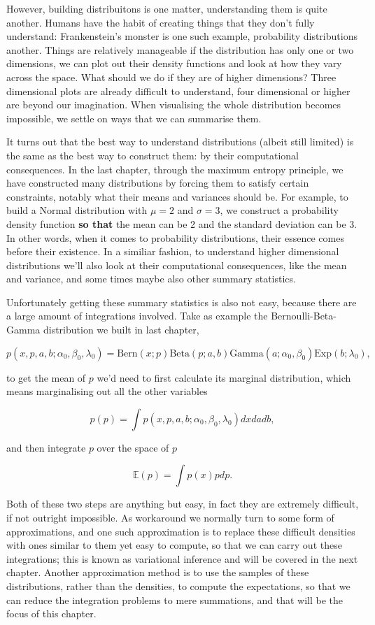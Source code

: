 \documentclass[11pt]{article}
\begin{document}
However, building distribuitons is one matter, understanding them is quite another. Humans have the habit of creating things that they don't fully understand: Frankenstein's monster is one such example, probability distributions another. Things are relatively manageable if the distribution has only one or two dimensions, we can plot out their density functions and look at how they vary across the space. What should we do if they are of higher dimensions? Three dimensional plots are already difficult to understand, four dimensional or higher are beyond our imagination. When visualising the whole distribution becomes impossible, we settle on ways that we can summarise them.

It turns out that the best way to understand distributions (albeit still limited) is the same as the best way to construct them: by their computational consequences. In the last chapter, through the maximum entropy principle, we have constructed many distributions by forcing them to satisfy certain constraints, notably what their means and variances should be. For example, to build a Normal distribution with \(\mu=2\) and \(\sigma=3\), we construct a probability density function \textbf{so that} the mean can be 2 and the standard deviation can be 3. In other words, when it comes to probability distributions, their essence comes before their existence. In a similiar fashion, to understand higher dimensional distributions we'll also look at their computational consequences, like the mean and variance, and some times maybe also other summary statistics.

Unfortunately getting these summary statistics is also not easy, because there are a large amount of integrations involved. Take as example the Bernoulli-Beta-Gamma distribution we built in last chapter,

$$ p(x, p, a, b; \alpha_0, \beta_0, \lambda_0) =
\text{Bern} (x; p) \text{Beta} (p; a, b) \text{Gamma} (a; \alpha_0, \beta_0) \text{Exp} (b; \lambda_0),$$

to get the mean of \(p\) we'd need to first calculate its marginal distribution, which means marginalising out all the other variables

$$ p(p) = \int p(x, p, a, b; \alpha_0, \beta_0, \lambda_0) dx da db, $$

and then integrate \(p\) over the space of \(p\)

$$ \mathbb{E} (p) = \int p(x) p dp. $$

Both of these two steps are anything but easy, in fact they are extremely difficult, if not outright impossible. As workaround we normally turn to some form of approximations, and one such approximation is to replace these difficult densities with ones similar to them yet easy to compute, so that we can carry out these integrations; this is known as variational inference and will be covered in the next chapter. Another approximation method is to use the samples of these distributions, rather than the densities, to compute the expectations, so that we can reduce the integration problems to mere summations, and that will be the focus of this chapter.
\end{document}
